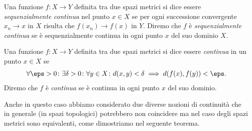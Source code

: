 \begin{definition}[continuità]%
  \label{def:continua_metrico}%
\mymark{**}%
Una funzione $f\colon X \to Y$ definita tra due spazi metrici
si dice essere \emph{sequenzialmente continua}%
 nel punto $x\in X$ se
per ogni successione convergente $x_n \to x$ in $X$ 
risulta che $f(x_n)\to f(x)$ in $Y$.
Diremo che $f$ è \emph{sequenzialmente continua} se è sequenzialmente continua
in ogni punto $x$ del suo dominio $X$.

Una funzione $f\colon X \to Y$ definita tra due spazi metrici
si dice essere \emph{continua}%
 in un punto $x\in X$ se
\begin{equation}\label{eq:continuita_metrico}
 \forall \eps>0\colon \exists \delta>0\colon \forall y \in X \colon
 d(x,y)< \delta \implies d(f(x), f(y)) < \eps.
\end{equation}
Diremo che $f$ è \emph{continua} se
è continua in ogni punto $x$ del suo dominio.
\end{definition}

Anche in questo caso abbiamo considerato due diverse nozioni di continuità che
in generale (in spazi topologici) potrebbero non coincidere ma nel caso degli
spazi metrici sono equivalenti, come dimostriamo nel seguente teorema.

